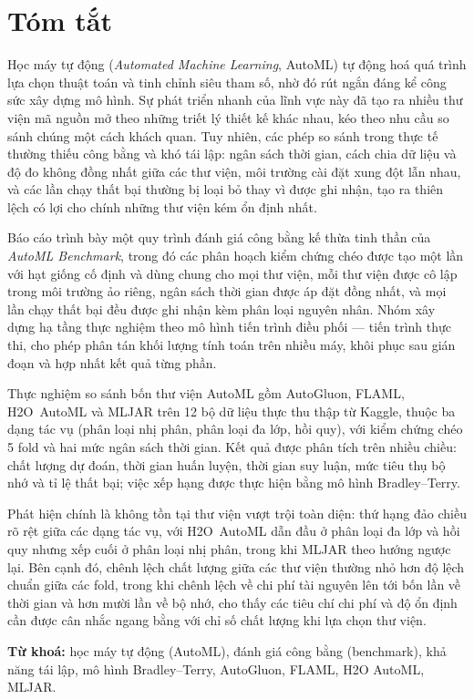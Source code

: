 \chapter*{Tóm tắt}

Học máy tự động (\textit{Automated Machine Learning}, AutoML) tự động hoá quá
trình lựa chọn thuật toán và tinh chỉnh siêu tham số, nhờ đó rút ngắn đáng kể công
sức xây dựng mô hình. Sự phát triển nhanh của lĩnh vực này đã tạo ra nhiều thư
viện mã nguồn mở theo những triết lý thiết kế khác nhau, kéo theo nhu cầu so sánh
chúng một cách khách quan. Tuy nhiên, các phép so sánh trong thực tế thường thiếu
công bằng và khó tái lập: ngân sách thời gian, cách chia dữ liệu và độ đo không
đồng nhất giữa các thư viện, môi trường cài đặt xung đột lẫn nhau, và các lần chạy
thất bại thường bị loại bỏ thay vì được ghi nhận, tạo ra thiên lệch có lợi cho
chính những thư viện kém ổn định nhất.

Báo cáo trình bày một quy trình đánh giá công bằng kế thừa tinh thần của
\textit{AutoML Benchmark}, trong đó các phân hoạch kiểm chứng chéo được tạo một lần với hạt giống
cố định và dùng chung cho mọi thư viện, mỗi thư viện được cô lập trong môi trường
ảo riêng, ngân sách thời gian được áp đặt đồng nhất, và mọi lần chạy thất bại đều
được ghi nhận kèm phân loại nguyên nhân. Nhóm xây dựng hạ tầng thực nghiệm theo mô
hình tiến trình điều phối --- tiến trình thực thi, cho phép phân tán khối lượng
tính toán trên nhiều máy, khôi phục sau gián đoạn và hợp nhất kết quả từng phần.

Thực nghiệm so sánh bốn thư viện AutoML gồm AutoGluon, FLAML, H2O~AutoML và MLJAR
trên 12 bộ dữ liệu thực thu thập từ Kaggle, thuộc ba dạng tác vụ (phân loại nhị
phân, phân loại đa lớp, hồi quy), với kiểm chứng chéo 5 fold và hai mức ngân sách
thời gian. Kết quả được phân tích trên nhiều chiều: chất lượng dự đoán, thời gian
huấn luyện, thời gian suy luận, mức tiêu thụ bộ nhớ và tỉ lệ thất bại; việc xếp
hạng được thực hiện bằng mô hình Bradley--Terry.

Phát hiện chính là không tồn tại thư viện vượt trội toàn diện: thứ hạng đảo chiều
rõ rệt giữa các dạng tác vụ, với H2O~AutoML dẫn đầu ở phân loại đa lớp và hồi quy
nhưng xếp cuối ở phân loại nhị phân, trong khi MLJAR theo hướng ngược lại. Bên
cạnh đó, chênh lệch chất lượng giữa các thư viện thường nhỏ hơn độ lệch chuẩn giữa
các fold, trong khi chênh lệch về chi phí tài nguyên lên tới bốn lần về thời gian
và hơn mười lần về bộ nhớ, cho thấy các tiêu chí chi phí và độ ổn định cần được
cân nhắc ngang bằng với chỉ số chất lượng khi lựa chọn thư viện.

\vspace{0.5cm}
\noindent\textbf{Từ khoá:} học máy tự động (AutoML), đánh giá công bằng
(benchmark), khả năng tái lập, mô hình Bradley--Terry, AutoGluon, FLAML,
H2O AutoML, MLJAR.
